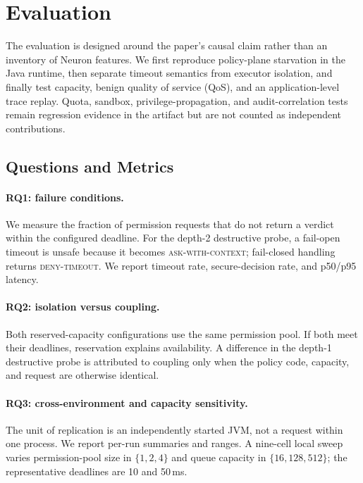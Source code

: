 \section{Evaluation}
\label{sec:eval}
\label{sec:eval-setup}
\label{sec:eval-cross}
\label{sec:eval-adaptive}
\label{sec:eval-adaptive-threshold}
\label{sec:eval-resource}
\label{sec:eval-supplement}

The evaluation is designed around the paper's causal claim rather than an
inventory of Neuron features. We first reproduce policy-plane starvation in
the Java runtime, then separate timeout semantics from executor isolation,
and finally test capacity, benign quality of service (QoS), and an
application-level trace replay. Quota, sandbox, privilege-propagation, and
audit-correlation tests remain regression evidence in the artifact but are not
counted as independent contributions.

\subsection{Questions and Metrics}

\paragraph{RQ1: failure conditions.}
We measure the fraction of permission requests that do not return a verdict
within the configured deadline. For the depth-2 destructive probe, a fail-open
timeout is unsafe because it becomes \textsc{ask-with-context}; fail-closed
handling returns \textsc{deny-timeout}. We report timeout rate, secure-decision
rate, and p50/p95 latency.

\paragraph{RQ2: isolation versus coupling.}
Both reserved-capacity configurations use the same permission pool. If both
meet their deadlines, reservation explains availability. A difference in the
depth-1 destructive probe is attributed to coupling only when the policy code,
capacity, and request are otherwise identical.

\paragraph{RQ3: cross-environment and capacity sensitivity.}
The unit of replication is an independently started JVM, not a request within
one process. We report per-run summaries and ranges. A nine-cell local sweep
varies permission-pool size in $\{1,2,4\}$ and queue capacity in
$\{16,128,512\}$; the representative deadlines are 10 and 50\,ms.

